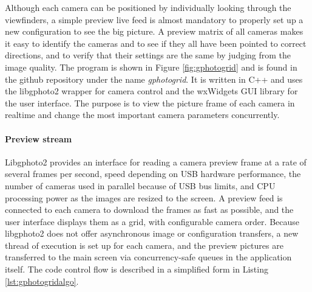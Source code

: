 
Although each camera can be positioned by individually looking through the viewfinders, a simple preview live feed is almost mandatory to properly set up a new configuration to see the big picture.
A preview matrix of all cameras makes it easy to identify the cameras and to see if they all have been pointed to correct directions, and to verify that their settings are the same by judging from the image quality.
The program is shown in Figure \ref{fig:gphotogrid} and is found in the github repository under the name \emph{gphotogrid}.
It is written in C++ and uses the libgphoto2 wrapper for camera control and the wxWidgets GUI library \cite{wxwidgets} for the user interface.
The purpose is to view the picture frame of each camera in realtime and change the most important camera parameters concurrently.

\paragraph{Preview stream}
Libgphoto2 provides an interface for reading a camera preview frame at a rate of several frames per second, speed depending on USB hardware performance, the number of cameras used in parallel because of USB bus limits, and CPU processing power as the images are resized to the screen.
A preview feed is connected to each camera to download the frames as fast as possible, and the user interface displays them as a grid, with configurable camera order.
Because libgphoto2 does not offer asynchronous image or configuration transfers, a new thread of execution is set up for each camera, and the preview pictures are transferred to the main screen via concurrency-safe queues in the application itself.
The code control flow is described in a simplified form in Listing \ref{lst:gphotogridalgo}.

